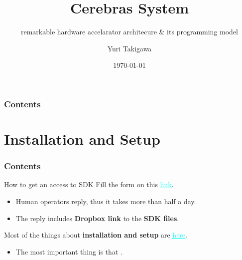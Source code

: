 \documentclass[dvipdfmx, 11pt, aspectratio=169]{beamer}   %
\title{Cerebras System}
\subtitle{remarkable hardware accelarator architecure \& its programming model}
\author{Yuri Takigawa}
\institute{The university of Tokyo, EEIC, Taura Lab}
\date{\today}
\newcommand{\ulhref}[2]{\href{#1}{\textcolor{cyan}{\uline{#2}}}}
\begin{document}
\begin{frame}
  \titlepage       
\end{frame}
\begin{frame}
  \frametitle{Contents}
  \tableofcontents
\end{frame}
\section{Installation and Setup}
\begin{frame}
    \frametitle{Contents}
    \tableofcontents[currentsection]
\end{frame}
\begin{frame}{How to get an access to SDK}
Fill the form on this \ulhref{https://www.cerebras.ai/developers/sdk-request}{link}.
\begin{itemize}
    \item Human operators reply, thus it takes more than half a day.
    \item The reply includes \textbf{Dropbox link} to the \textbf{SDK files}.
\end{itemize}
Most of the things about \textbf{installation and setup} are \ulhref{https://sdk.cerebras.net/installation-guide}{here}.
\begin{itemize}
    \item The most important thing is that .
\end{itemize}
\end{frame}
\end{document}
